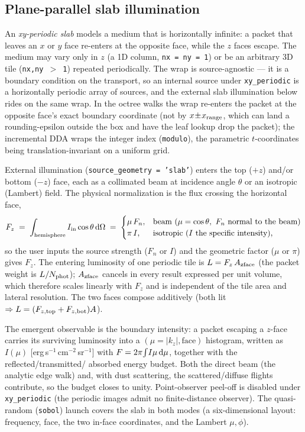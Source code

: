 \documentclass[english,a4paper]{my_memo}
\newcommand{\code}[1]{\texttt{#1}}
\begin{document}
\subsection{Plane-parallel slab illumination}
\label{sec:slab}
An \emph{xy-periodic slab} models a medium that is horizontally infinite: a
packet that leaves an $x$ or $y$ face re-enters at the opposite face, while the
$z$ faces escape.  The medium may vary only in $z$ (a 1D column,
\code{nx\,=\,ny\,=\,1}) or be an arbitrary 3D tile (\code{nx,ny\,$>$\,1})
repeated periodically.  The wrap is source-agnostic --- it is a boundary
condition on the transport, so an internal source under \code{xy\_periodic} is
a horizontally periodic array of sources, and the external slab illumination
below rides on the same wrap.  In the octree walks the wrap re-enters the
packet at the opposite face's exact boundary coordinate (not by
$x\!\pm\!x_{\rm range}$, which can land a rounding-epsilon outside the box and
have the leaf lookup drop the packet); the incremental DDA wraps the integer
index (\code{modulo}), the parametric $t$-coordinates being
translation-invariant on a uniform grid.

External illumination (\code{source\_geometry\,=\,'slab'}) enters the top
($+z$) and/or bottom ($-z$) face, each as a collimated beam at incidence angle
$\theta$ or an isotropic (Lambert) field.  The physical normalization is the
flux crossing the horizontal face,
\begin{equation}
  F_z \;=\; \int_{\rm hemisphere} I_{\rm in}\cos\theta \, {\rm d}\Omega \;=\;
  \begin{cases} \mu\,F_n, & \text{beam } (\mu=\cos\theta,\ F_n \text{ normal to the beam)} \\
                \pi\,I,   & \text{isotropic } (I \text{ the specific intensity)}, \end{cases}
\end{equation}
so the user inputs the source strength ($F_n$ or $I$) and the geometric factor
($\mu$ or $\pi$) gives $F_z$.  The entering luminosity of one periodic tile is
$L = F_z\,A_{\rm zface}$ (the packet weight is $L/N_{\rm phot}$); $A_{\rm zface}$
cancels in every result expressed per unit volume, which therefore scales linearly with $F_z$
and is independent of the tile area and lateral resolution.  The two faces
compose additively (both lit $\Rightarrow L=(F_{z,{\rm top}}+F_{z,{\rm bot}})A$).

The emergent observable is the boundary intensity: a packet escaping a $z$-face
carries its surviving luminosity into a $(\mu=|k_z|,\text{face})$ histogram,
written as $I(\mu)$ [erg\,s$^{-1}$\,cm$^{-2}$\,sr$^{-1}$] with
$F=2\pi\!\int\! I\mu\,{\rm d}\mu$, together with the reflected/transmitted/
absorbed energy budget.  Both the direct beam (the analytic edge walk) and,
with dust scattering, the scattered/diffuse flights contribute, so the budget
closes to unity.  Point-observer peel-off is disabled under \code{xy\_periodic}
(the periodic images admit no finite-distance observer).  The quasi-random
(\code{sobol}) launch covers the slab in both modes (a six-dimensional layout:
frequency, face, the two in-face coordinates, and the Lambert $\mu,\phi$).
\end{document}
